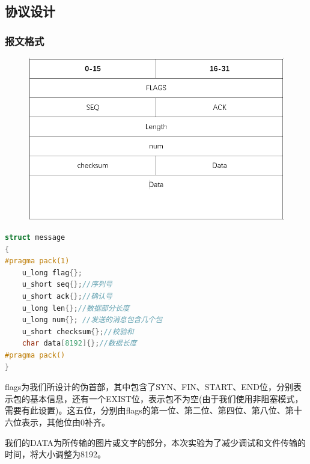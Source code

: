 \documentclass[UTF8,a4paper,10pt]{ctexart}
\begin{document}
\subsection{协议设计}
\subsubsection{报文格式}
\begin{figure}[H]
    \centering
    \includegraphics[scale=0.6]{计网1.png}
    \label{fig:1}
\end{figure}
\begin{lstlisting}[title=报文格式,frame=trbl,language={C++}]
struct message
{
#pragma pack(1)
    u_long flag{};
    u_short seq{};//序列号
    u_short ack{};//确认号
    u_long len{};//数据部分长度
    u_long num{}; //发送的消息包含几个包
    u_short checksum{};//校验和
    char data[8192]{};//数据长度
#pragma pack()
}
\end{lstlisting}
flags为我们所设计的伪首部，其中包含了SYN、FIN、START、END位，分别表示包的基本信息，还有一个EXIST位，表示包不为空(由于我们使用非阻塞模式，需要有此设置)。这五位，分别由flags的第一位、第二位、第四位、第八位、第十六位表示，其他位由0补齐。\par
我们的DATA为所传输的图片或文字的部分，本次实验为了减少调试和文件传输的时间，将大小调整为8192。
\end{document}
